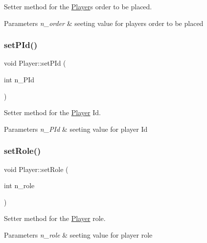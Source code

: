 Setter method for the \hyperlink{class_player}{Player}\textquotesingle{}s order to be placed. 


\begin{DoxyParams}{Parameters}
{\em n\+\_\+order} & seeting value for player\textquotesingle{}s order to be placed \\
\hline
\end{DoxyParams}
\mbox{\label{class_player_a534f0e79b1e7a6310f3d02e04b95b4b4}} 
\subsubsection{\texorpdfstring{set\+P\+Id()}{setPId()}}
{\footnotesize\ttfamily void Player\+::set\+P\+Id (\begin{DoxyParamCaption}\item[{int}]{n\+\_\+\+P\+Id }\end{DoxyParamCaption})}



Setter method for the \hyperlink{class_player}{Player} Id. 


\begin{DoxyParams}{Parameters}
{\em n\+\_\+\+P\+Id} & seeting value for player Id \\
\hline
\end{DoxyParams}
\mbox{\label{class_player_a5def6f94584d296aaba2d620697a8922}} 
\subsubsection{\texorpdfstring{set\+Role()}{setRole()}}
{\footnotesize\ttfamily void Player\+::set\+Role (\begin{DoxyParamCaption}\item[{int}]{n\+\_\+role }\end{DoxyParamCaption})}



Setter method for the \hyperlink{class_player}{Player} role. 


\begin{DoxyParams}{Parameters}
{\em n\+\_\+role} & seeting value for player role \\
\hline
\end{DoxyParams}
\mbox{\label{class_player_a68db574596d1ca040f454d34310149ee}} 
